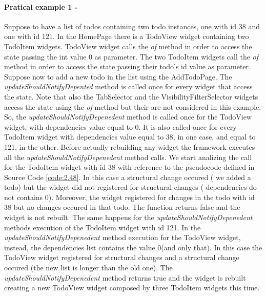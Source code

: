 \paragraph{Pratical example 1 - } 
\label{subpar:todo_updating_feature_inherited_wdiget}
Suppose to have a list of todos containing two todo instances, one with id 38 and one with id 121. In the HomePage there is a TodoView widget containing two TodoItem widgets. TodoView widget calls the \textit{of} method in order to access the state passing the int value 0 as parameter. The two TodoItem widgets call the \textit{of} method in order to access the state passing their todo's id value as parameter. Suppose now to add a new todo in the list using the AddTodoPage. The \textit{updateShouldNotifyDepented} method is called once for every widget that access the state. Note that also the TabSelector and the VisibilityFilterSelector widgets access the state using the \textit{of} method but their are not considered in this example. So, the \textit{updateShouldNotifyDepenedent} method is called once for the TodoView widget, with dependencies value equal to 0. It is also called once for every TodoItem widget with dependencies value equal to 38, in one case, and equal to 121, in the other. Before actually rebuilding any widget the framework executes all the \textit{updateShouldNotifyDepenedent} method calls. We start analizing the call for the TodoItem widget with id 38 with reference to the pseudocode defined in Source Code \ref{code:2.48}. In this case a structural change occured ( we added a todo)  but the widget did not registered for structural changes ( dependencies do not contains 0). Moreover, the widget registered for changes in the todo with id 38 but no changes occured in that todo. The function returns false and the widget is not rebuilt. The same happens for the \textit{updateShouldNotifyDepenedent} methods execution of the TodoItem widget with id 121. In the \textit{updateShouldNotifyDepenedent} method execution for the TodoView widget, instead, the dependencies list contains the value 0(and only that). In this case the TodoView widget registered for structural changes and a structural change occured (the new list is longer than the old one). The \textit{updateShouldNotifyDepenedent} method returns true and the widget is rebuilt creating a new TodoView widget composed by three TodoItem widgets this time.
